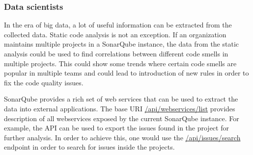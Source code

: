 \FloatBarrier

\subsubsection{Data scientists}


In the era of big data, a lot of useful information can be extracted from the collected data.
Static code analysis is not an exception.
If an organization maintains multiple projects in a SonarQube instance, the data from the static
analysis could be used to find correlations between different code smells in multiple projects.
This could show some trends where certain code smells are popular in multiple teams and could
lead to introduction of new rules in order to fix the code quality issues.

SonarQube provides a rich set of web services that can be used to extract the data into external applications.
The base URI \url{/api/webservices/list} provides description of all webservices exposed by the current SonarQube instance.
For example, the API can be used to export the issues found in the project for further analysis.
In order to achieve this, one would use the \url{/api/issues/search} endpoint in order to search for issues inside the projects.
